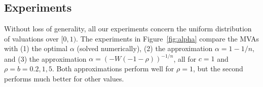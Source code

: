 


\subsection{Experiments}\label{sec:eff_experiment}

Without loss of generality, all our experiments concern the uniform distribution of valuations over $[0,1)$.
The experiments in Figure~\ref{fig:alpha} compare the MVAs with (1) the
optimal $\alpha$ (solved numerically), (2) the approximation
 $\alpha = 1-1/n$, and (3) the approximation 
$\alpha = (-W(-1-\rho))^{-1/n}$, all for $c=1$ and
$\rho = b = 0.2, 1, 5$.
Both approximations perform well for $\rho=1$, but the second performs much
better for other values.




